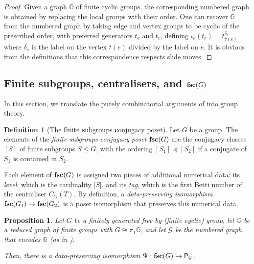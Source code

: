 \documentclass[11pt, a4 paper]{amsart}
\numberwithin{equation}{section}
\newtheorem{proposition}[theorem]{Proposition}
\theoremstyle{remark}
\theoremstyle{definition}
\newtheorem{definition}[theorem]{Definition}
\def\tsc{{\rm{\bf{fsc}}}}
\def\GG{\mathbb{G}}
\def\mc{\mathcal}
\def\t{\tau}
\begin{document}
\begin{proof}
	Given a graph $\GG$ of finite cyclic groups, the corresponding numbered graph is obtained by replacing the
	local groups with their order. One can recover  $\GG$ from the numbered graph by taking edge and vertex groups to be
	cyclic of the prescribed order, with preferred generators $t_e$ and $t_v$, defining $\iota_e(t_e) = t_{\t(e)}^{\delta_e}$
	where $\delta_e$ is the label on the vertex $t(e)$ divided by the label on $e$. It is obvious from the definitions that
	this correspondence respects slide moves.
\end{proof}


\subsection{Finite subgroups, centralisers, and $\tsc(G)$}
\label{sec:torsion}

In this section, we translate the purely combinatorial arguments 
of  into group theory. 

\begin{definition}
[The {\bf{f}}inite {\bf{s}}ubgroups {\bf{c}}onjugacy poset]
\label{def:torsion-subgroups-conjugacy-poset}
	Let $G$ be a group. 
	The elements of the 
	\emph{finite subgroups conjugacy poset} $\tsc(G)$ 
	are the conjugacy classes $[S]$ of finite subgroups $S \leq G$, 
	with the ordering $[S_1] \preceq [S_2]$ 
	if a conjugate of $S_1$ is contained in $S_2$. 
	
	Each element of $\tsc(G)$ is assigned two pieces 
	of additional numerical data: 
	its {\em level}, which is the cardinality $|S|$,
	and its {\em tag}, 
	which is the first Betti number of the centraliser $C_G(T)$. 
	By definition, a {\em data-preserving isomorphism} 
	$\tsc(G_1)\to \tsc(G_2)$ 
	is a poset isomorphism that preserves this numerical data. 
\end{definition}

\begin{proposition}
\label{associated_poset_is_torsion_subgroups}
	Let $G$ be a finitely generated free-by-(finite cyclic) group, 
	let $\GG$ be a reduced graph of finite groups 
	with $G\cong \pi_1\GG$, 
	and let $\mc{G}$ be the numbered graph that encodes $\GG$ 
	(as in ).  
	
	Then, there is a data-preserving isomorphism 
	$\Psi: \tsc(G)\to \mathsf{P}_\mathcal{G}$. 
\end{proposition}
\end{document}
